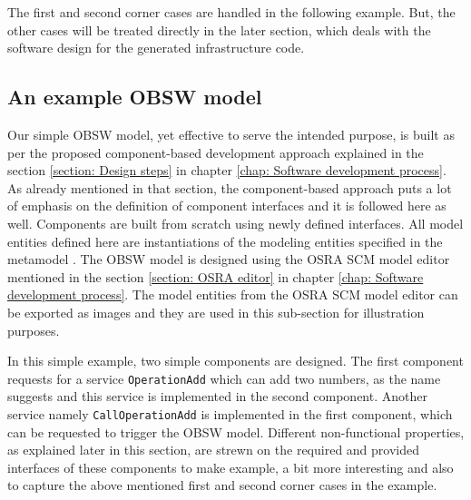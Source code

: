 The first and second corner cases are handled in the following example. But, the other cases will be treated directly in the later section, which deals with the software design for the generated infrastructure code. 

\subsection{An example OBSW model}
Our simple OBSW model, yet effective to serve the intended purpose, is built as per the proposed component-based development approach explained in the section \cref{section: Design steps} in chapter \cref{chap: Software development process}. As already mentioned in that section, the component-based approach puts a lot of emphasis on the definition of component interfaces \cite{CompBasedProcess} and it is followed here as well. Components are built from scratch using newly defined interfaces. All model entities defined here are instantiations of the modeling entities specified in the metamodel \cite{SpecMetamodel}. The OBSW model is designed using the OSRA SCM model editor mentioned in the section \cref{section: OSRA editor} in chapter \cref{chap: Software development process}. The model entities from the OSRA SCM model editor can be exported as images and they are used in this sub-section for illustration purposes.

In this simple example, two simple components are designed. The first component requests for a service \texttt{OperationAdd} which can add two numbers, as the name suggests and this service is implemented in the second component. Another service namely \texttt{Call\allowbreak Operation\allowbreak Add} is implemented in the first component, which can be requested to trigger the OBSW model. Different non-functional properties, as explained later in this section, are strewn on the required and provided interfaces of these components to make example, a bit more interesting and also to capture the above mentioned first and second corner cases in the example.

